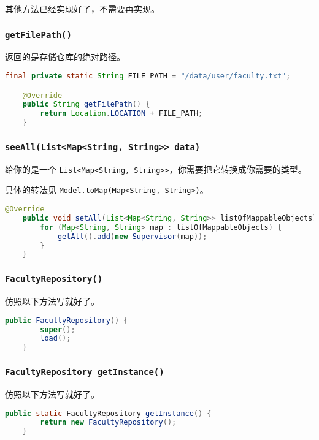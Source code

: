 \documentclass[hyperref,UTF8,12pt,a4paper]{ctexart}
\begin{document}
其他方法已经实现好了，不需要再实现。

\subsubsection{\texttt{getFilePath()}}

返回的是存储仓库的绝对路径。

\begin{lstlisting}[language=Java]
    final private static String FILE_PATH = "/data/user/faculty.txt";

    @Override
    public String getFilePath() {
        return Location.LOCATION + FILE_PATH;
    }
\end{lstlisting}

\subsubsection{\texttt{seeAll(List<Map<String, String>> data)}}

给你的是一个 \texttt{List<Map<String, String>>}，你需要把它转换成你需要的类型。

具体的转法见 \texttt{Model.toMap(Map<String, String>)}。

\begin{lstlisting}[language=Java]
    @Override
    public void setAll(List<Map<String, String>> listOfMappableObjects) {
        for (Map<String, String> map : listOfMappableObjects) {
            getAll().add(new Supervisor(map));
        }
    }
\end{lstlisting}

\subsubsection{\texttt{FacultyRepository()}}

仿照以下方法写就好了。

\begin{lstlisting}[language=Java]
	public FacultyRepository() {
		super();
		load();
	}
\end{lstlisting}

\subsubsection{\texttt{FacultyRepository getInstance()}}

仿照以下方法写就好了。

\begin{lstlisting}[language=Java]
	public static FacultyRepository getInstance() {
		return new FacultyRepository();
	}
\end{lstlisting}
\end{document}
